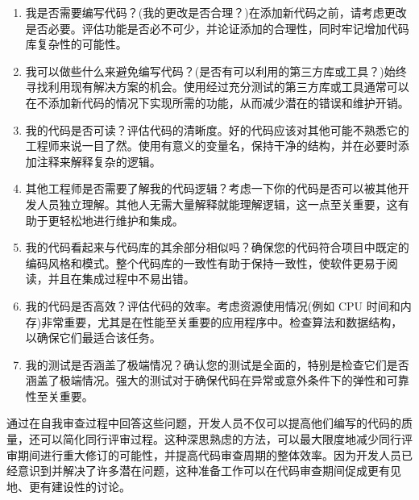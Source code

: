 \begin{enumerate}
\item
我是否需要编写代码？(我的更改是否合理？)在添加新代码之前，请考虑更改是否必要。评估功能是否必不可少，并论证添加的合理性，同时牢记增加代码库复杂性的可能性。

\item
我可以做些什么来避免编写代码？(是否有可以利用的第三方库或工具？)始终寻找利用现有解决方案的机会。使用经过充分测试的第三方库或工具通常可以在不添加新代码的情况下实现所需的功能，从而减少潜在的错误和维护开销。

\item
我的代码是否可读？评估代码的清晰度。好的代码应该对其他可能不熟悉它的工程师来说一目了然。使用有意义的变量名，保持干净的结构，并在必要时添加注释来解释复杂的逻辑。

\item
其他工程师是否需要了解我的代码逻辑？考虑一下你的代码是否可以被其他开发人员独立理解。其他人无需大量解释就能理解逻辑，这一点至关重要，这有助于更轻松地进行维护和集成。

\item
我的代码看起来与代码库的其余部分相似吗？确保您的代码符合项目中既定的编码风格和模式。整个代码库的一致性有助于保持一致性，使软件更易于阅读，并且在集成过程中不易出错。

\item
我的代码是否高效？评估代码的效率。考虑资源使用情况(例如 CPU 时间和内存)非常重要，尤其是在性能至关重要的应用程序中。检查算法和数据结构，以确保它们最适合该任务。

\item
我的测试是否涵盖了极端情况？确认您的测试是全面的，特别是检查它们是否涵盖了极端情况。强大的测试对于确保代码在异常或意外条件下的弹性和可靠性至关重要。
\end{enumerate}

通过在自我审查过程中回答这些问题，开发人员不仅可以提高他们编写的代码的质量，还可以简化同行评审过程。这种深思熟虑的方法，可以最大限度地减少同行评审期间进行重大修订的可能性，并提高代码审查周期的整体效率。因为开发人员已经意识到并解决了许多潜在问题，这种准备工作可以在代码审查期间促成更有见地、更有建设性的讨论。




















